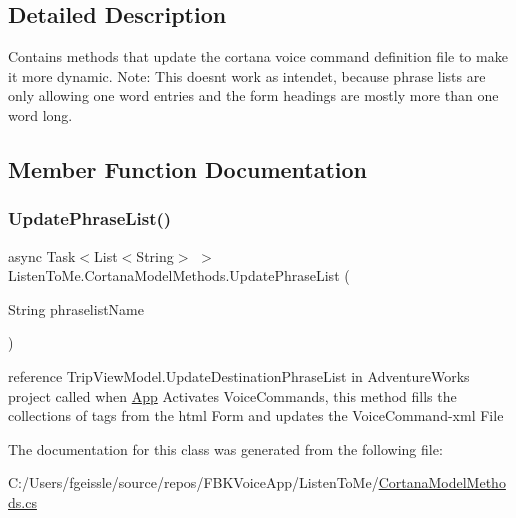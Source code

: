 \subsection{Detailed Description}
Contains methods that update the cortana voice command definition file to make it more dynamic. Note\+: This doesn\textquotesingle{}t work as intendet, because phrase lists are only allowing one word entries and the form headings are mostly more than one word long. 



\subsection{Member Function Documentation}
\mbox{\label{class_listen_to_me_1_1_cortana_model_methods_afe872337c3f1c74f5db6e26918f29ac1}} 
\subsubsection{\texorpdfstring{Update\+Phrase\+List()}{UpdatePhraseList()}}
{\footnotesize\ttfamily async Task$<$List$<$String$>$ $>$ Listen\+To\+Me.\+Cortana\+Model\+Methods.\+Update\+Phrase\+List (\begin{DoxyParamCaption}\item[{String}]{phraselist\+Name }\end{DoxyParamCaption})}



reference Trip\+View\+Model.\+Update\+Destination\+Phrase\+List in Adventure\+Works project called when \mbox{\hyperlink{class_listen_to_me_1_1_app}{App}} Activates Voice\+Commands, this method fills the collections of tags from the html Form and updates the Voice\+Command-\/xml File 



The documentation for this class was generated from the following file\+:\begin{DoxyCompactItemize}
\item 
C\+:/\+Users/fgeissle/source/repos/\+F\+B\+K\+Voice\+App/\+Listen\+To\+Me/\mbox{\hyperlink{_cortana_model_methods_8cs}{Cortana\+Model\+Methods.\+cs}}\end{DoxyCompactItemize}
